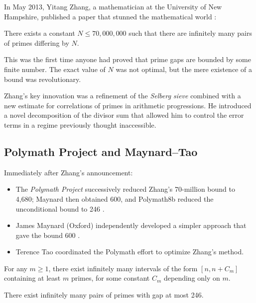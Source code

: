 In May 2013, Yitang Zhang, a mathematician at the University of New Hampshire, published a paper that stunned the mathematical world \cite{zhang2014}:

\begin{theorem}
There exists a constant $N \leq 70,000,000$ such that there are infinitely many pairs of primes differing by $N$.
\end{theorem}

This was the first time anyone had proved that prime gaps are bounded by some finite number. The exact value of $N$ was not optimal, but the mere existence of a bound was revolutionary.

Zhang's key innovation was a refinement of the \emph{Selberg sieve} combined with a new estimate for correlations of primes in arithmetic progressions. He introduced a novel decomposition of the divisor sum that allowed him to control the error terms in a regime previously thought inaccessible.

\subsection{Polymath Project and Maynard--Tao}

Immediately after Zhang's announcement:

\begin{itemize}
\item The \emph{Polymath Project} successively reduced Zhang's 70-million bound to 4,680; Maynard then obtained 600, and Polymath8b reduced the unconditional bound to 246 \cite{polymath2014}.
\item James Maynard (Oxford) independently developed a simpler approach that gave the bound 600 \cite{maynard2015}.
\item Terence Tao coordinated the Polymath effort to optimize Zhang's method.
\end{itemize}

\begin{theorem}
For any $m \geq 1$, there exist infinitely many intervals of the form $[n, n + C_m]$ containing at least $m$ primes, for some constant $C_m$ depending only on $m$.
\end{theorem}

\begin{theorem}
There exist infinitely many pairs of primes with gap at most 246.
\end{theorem}

